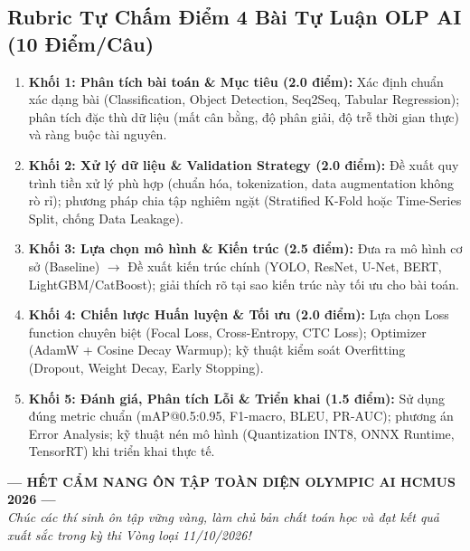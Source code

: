 \documentclass[10pt,a4paper]{article}
\begin{document}
\subsection{Rubric Tự Chấm Điểm 4 Bài Tự Luận OLP AI (10 Điểm/Câu)}
\begin{enumerate}[leftmargin=*]
    \item \textbf{Khối 1: Phân tích bài toán \& Mục tiêu (2.0 điểm):} Xác định chuẩn xác dạng bài (Classification, Object Detection, Seq2Seq, Tabular Regression); phân tích đặc thù dữ liệu (mất cân bằng, độ phân giải, độ trễ thời gian thực) và ràng buộc tài nguyên.
    \item \textbf{Khối 2: Xử lý dữ liệu \& Validation Strategy (2.0 điểm):} Đề xuất quy trình tiền xử lý phù hợp (chuẩn hóa, tokenization, data augmentation không rò rỉ); phương pháp chia tập nghiêm ngặt (Stratified K-Fold hoặc Time-Series Split, chống Data Leakage).
    \item \textbf{Khối 3: Lựa chọn mô hình \& Kiến trúc (2.5 điểm):} Đưa ra mô hình cơ sở (Baseline) $\to$ Đề xuất kiến trúc chính (YOLO, ResNet, U-Net, BERT, LightGBM/CatBoost); giải thích rõ tại sao kiến trúc này tối ưu cho bài toán.
    \item \textbf{Khối 4: Chiến lược Huấn luyện \& Tối ưu (2.0 điểm):} Lựa chọn Loss function chuyên biệt (Focal Loss, Cross-Entropy, CTC Loss); Optimizer (AdamW + Cosine Decay Warmup); kỹ thuật kiểm soát Overfitting (Dropout, Weight Decay, Early Stopping).
    \item \textbf{Khối 5: Đánh giá, Phân tích Lỗi \& Triển khai (1.5 điểm):} Sử dụng đúng metric chuẩn (mAP@0.5:0.95, F1-macro, BLEU, PR-AUC); phương án Error Analysis; kỹ thuật nén mô hình (Quantization INT8, ONNX Runtime, TensorRT) khi triển khai thực tế.
\end{enumerate}

\vspace{1.5em}
\begin{center}
    {\small \textbf{--- HẾT CẨM NANG ÔN TẬP TOÀN DIỆN OLYMPIC AI HCMUS 2026 ---}} \\
    {\footnotesize \textit{Chúc các thí sinh ôn tập vững vàng, làm chủ bản chất toán học và đạt kết quả xuất sắc trong kỳ thi Vòng loại 11/10/2026!}}
\end{center}
\end{document}
